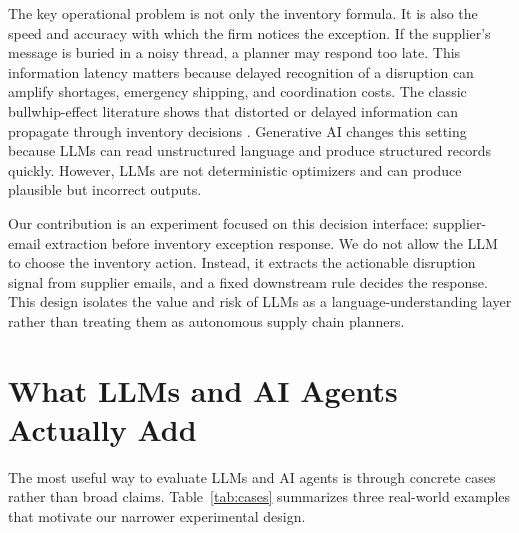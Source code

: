 \documentclass[11pt]{article}
\begin{document}
The key operational problem is not only the inventory formula. It is also the speed and accuracy with which the firm notices the exception. If the supplier's message is buried in a noisy thread, a planner may respond too late. This information latency matters because delayed recognition of a disruption can amplify shortages, emergency shipping, and coordination costs. The classic bullwhip-effect literature shows that distorted or delayed information can propagate through inventory decisions \citep{lee1997bullwhip}. Generative AI changes this setting because LLMs can read unstructured language and produce structured records quickly. However, LLMs are not deterministic optimizers and can produce plausible but incorrect outputs.

Our contribution is an experiment focused on this decision interface: supplier-email extraction before inventory exception response. We do not allow the LLM to choose the inventory action. Instead, it extracts the actionable disruption signal from supplier emails, and a fixed downstream rule decides the response. This design isolates the value and risk of LLMs as a language-understanding layer rather than treating them as autonomous supply chain planners.

\section{What LLMs and AI Agents Actually Add}

The most useful way to evaluate LLMs and AI agents is through concrete cases rather than broad claims. Table~\ref{tab:cases} summarizes three real-world examples that motivate our narrower experimental design.
\end{document}
